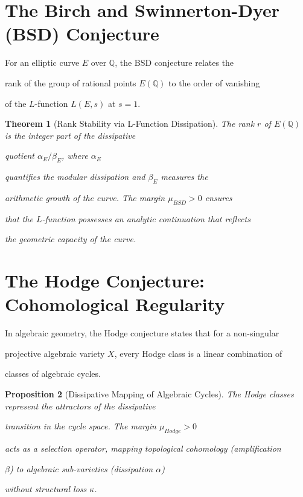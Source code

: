 \documentclass[11pt,a4paper]{amsart}
\newtheorem{theorem}{Theorem}[section]
\newtheorem{proposition}[theorem]{Proposition}
\newcommand{\alphacoeff}{\ensuremath{\alpha}}
\newcommand{\betacoeff}{\ensuremath{\beta}}
\newcommand{\kappacoeff}{\ensuremath{\kappa}}
\newcommand{\mumargin}{\ensuremath{\mu}}
\begin{document}

\section{The Birch and Swinnerton-Dyer (BSD) Conjecture}

For an elliptic curve $E$ over $\mathbb{Q}$, the BSD conjecture relates the 

rank of the group of rational points $E(\mathbb{Q})$ to the order of vanishing 

of the $L$-function $L(E, s)$ at $s=1$.



\begin{theorem}[Rank Stability via L-Function Dissipation]

The rank $r$ of $E(\mathbb{Q})$ is the integer part of the dissipative 

quotient $\alphacoeff_{E} / \betacoeff_{E}$, where $\alphacoeff_{E}$ 

quantifies the modular dissipation and $\betacoeff_{E}$ measures the 

arithmetic growth of the curve. The margin $\mumargin_{BSD} > 0$ ensures 

that the $L$-function possesses an analytic continuation that reflects 

the geometric capacity of the curve.

\end{theorem}




\section{The Hodge Conjecture: Cohomological Regularity}

In algebraic geometry, the Hodge conjecture states that for a non-singular 

projective algebraic variety $X$, every Hodge class is a linear combination of 

classes of algebraic cycles.



\begin{proposition}[Dissipative Mapping of Algebraic Cycles]

The Hodge classes represent the \emph{attractors} of the dissipative 

transition in the cycle space. The margin $\mumargin_{Hodge} > 0$ 

acts as a selection operator, mapping topological cohomology (amplification 

$\betacoeff$) to algebraic sub-varieties (dissipation $\alphacoeff$) 

without structural loss $\kappacoeff$.

\end{proposition}
\end{document}

